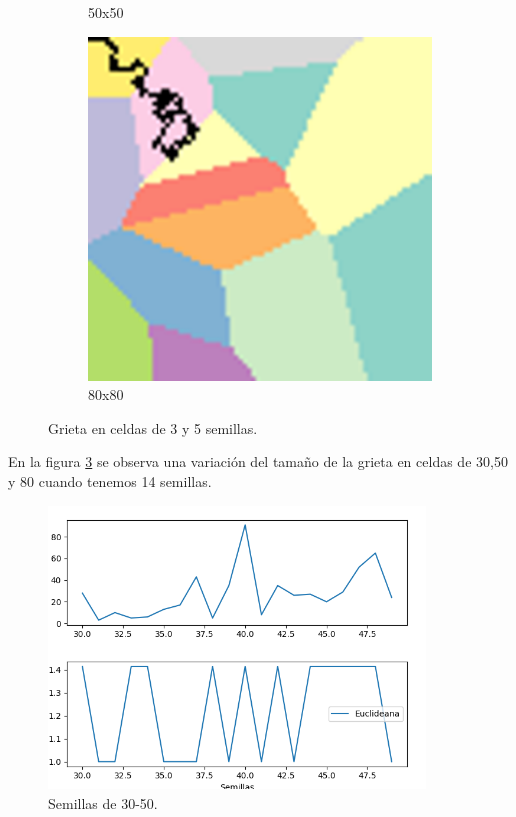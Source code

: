 \documentclass{article}
\begin{document}
\begin{figure}[H]
\begin{subfigure}[b]{0.45\linewidth}
            \caption{50x50}
            \label{fig:westminster_aerea}
        \end{subfigure}
 \begin{subfigure}[b]{0.45\linewidth}
            \includegraphics[width=\linewidth]{14ochentaveinte_14.png}
            \caption{80x80}
            \label{fig:westminster_aerea}
        \end{subfigure}
        \caption{Grieta en celdas de 3 y 5 semillas.}
        \label{f4}
\end{figure}

En la figura \ref{f4} se observa una variaci\'on del tama\~no de la grieta en celdas de 30,50 y 80 cuando tenemos 14 semillas.

\begin{figure}[H]
  \begin{center}
    \includegraphics[width=10cm]{80x80-30-50.png}
  \end{center}
  \caption{Semillas de 30-50.}
  \label{f5}
\end{figure}
\end{document}
